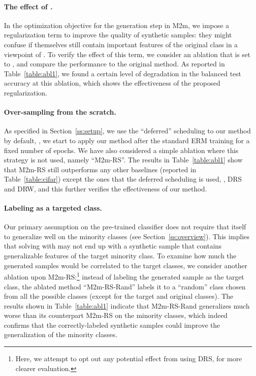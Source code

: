 \vspace{-0.15in}
\paragraph{The effect of .} In the optimization objective  for the generation step in M2m, we impose a regularization term  to improve the quality of synthetic samples: they might confuse  if themselves still contain important features of the original class in a viewpoint of . To verify the effect of this term, we consider an ablation that  is set to , and compare the performance to the original method. As reported in Table~\ref{table:abl1}, we found a certain level of degradation in the balanced test accuracy at this ablation, which shows the effectiveness of the proposed regularization.

\vspace{-0.15in}
\paragraph{Over-sampling from the scratch.} 
As specified in Section~\ref{ss:setup}, we use the ``deferred'' scheduling to our method by default, \ie, we start to apply our method after the standard ERM training for a fixed number of epochs. We have also considered a simple ablation where this strategy is not used, namely ``M2m-RS''. The results in Table~\ref{table:abl1} show that M2m-RS still outperforms any other baselines (reported in Table~\ref{table:cifar}) except the ones that the deferred scheduling is used, \ie, DRS and DRW, and this further verifies the effectiveness of our method.

\vspace{-0.15in}
\paragraph{Labeling as a targeted class.} 
Our primary assumption on the pre-trained classifier  does not require that  itself to generalize well on the minority classes (see Section~\ref{ss:overview}). This implies that solving  with  may not end up with a synthetic sample that contains generalizable features of the target minority class. To examine how much the generated samples would be correlated to the target classes, we consider another ablation upon M2m-RS:\footnote{Here, we attempt to opt out any potential effect from using DRS, for more clearer evaluation.} 
instead of labeling the generated sample as the target class, the ablated method ``M2m-RS-Rand'' labels it to a ``random'' class chosen from all the possible classes (except for the target and original classes). The results shown in Table~\ref{table:abl1} indicate that M2m-RS-Rand generalizes much worse than its counterpart M2m-RS on the minority classes, which indeed confirms that the correctly-labeled synthetic samples could improve the generalization of the minority classes. 

